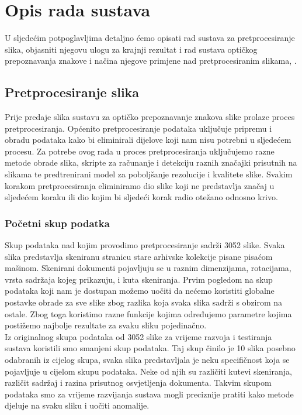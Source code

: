 \documentclass[times, utf8, zavrsni, numeric]{fer}
\begin{document}
\chapter{Opis rada sustava}
U sljedećim potpoglavljima detaljno ćemo opisati rad sustava za pretprocesiranje slika, objasniti njegovu ulogu za krajnji rezultat i rad sustava optičkog prepoznavanja znakove i načina njegove primjene nad pretprocesiranim slikama\cite{nanonets}, \cite{guideOCR}.

\section{Pretprocesiranje slika}
Prije predaje slika sustavu za optičko prepoznavanje znakova slike prolaze proces pretprocesiranja. Općenito pretprocesiranje podataka uključuje pripremu i obradu podataka kako bi eliminirali dijelove  koji nam nisu potrebni u sljedećem procesu. Za potrebe ovog rada u proces pretprocesiranja uključujemo razne metode obrade slika, skripte za računanje i detekciju raznih značajki prisutnih na slikama te predtrenirani model za poboljšanje rezolucije i kvalitete slike. Svakim korakom pretprocesiranja eliminiramo dio slike koji ne predstavlja značaj u sljedećem koraku ili dio kojim bi sljedeći korak radio otežano odnosno krivo.

\subsection{Početni skup podatka}
Skup podataka nad kojim provodimo pretprocesiranje sadrži 3052 slike. Svaka slika predstavlja skeniranu stranicu stare arhivske kolekcije pisane pisaćom mašinom. Skenirani dokumenti pojavljuju se u raznim dimenzijama, rotacijama, vrsta sadržaja kojeg prikazuju, i kuta skeniranja. Prvim pogledom na skup podataka koji nam je dostupan možemo uočiti da nećemo koristiti globalne postavke obrade za sve slike zbog razlika koja svaka slika sadrži s obzirom na ostale. Zbog toga koristimo razne funkcije kojima određujemo parametre kojima postižemo najbolje rezultate za svaku sliku pojedinačno.
\\
Iz originalnog skupa podataka od 3052 slike za vrijeme razvoja i testiranja sustava koristili smo smanjeni skup podataka. Taj skup činilo je 10 slika posebno odabranih iz cijelog skupa, svaka slika predstavljala je neku specifičnost koja se pojavljuje u cijelom skupu podataka. Neke od njih su različiti kutevi skeniranja, različit sadržaj i razina prisutnog osvjetljenja dokumenta. Takvim skupom podataka smo za vrijeme razvijanja sustava mogli preciznije pratiti kako metode djeluje na svaku sliku i uočiti anomalije.
\end{document}
